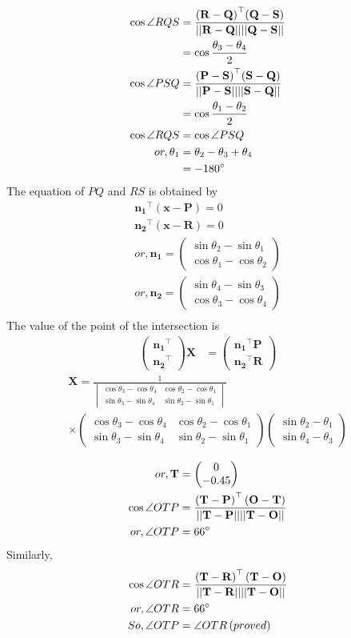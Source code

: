 \documentclass[12pt]{article}
\providecommand{\brak}[1]{\ensuremath{\left(#1\right)}}
\providecommand{\myvec}[1]{\ensuremath{\begin{pmatrix}#1\end{pmatrix}}}
\providecommand{\mydet}[1]{\ensuremath{\begin{vmatrix}#1\end{vmatrix}}}
\providecommand{\norm}[1]{\ensuremath{\lvert|#1\rvert|}}
\let\vec\mathbf
\begin{document}
\begin{align}
  \cos{\angle RQS}&=\frac{\vec{\brak{R-Q}}^{\top}\vec{\brak{Q-S}}}{\vec{\norm{R-Q}\norm{Q-S}}}\\
  &=\cos{\frac{\theta_3-\theta_4}{2}}\\
   \cos{\angle PSQ}&=\frac{\vec{\brak{P-S}}^{\top}\vec{\brak{S-Q}}}{\vec{\norm{P-S}\norm{S-Q}}}\\
  &=\cos{\frac{\theta_1-\theta_2}{2}}\\
   \cos{\angle RQS}&=\cos{\angle PSQ}\\
   or,\theta_1&=\theta_2-\theta_3+\theta_4\\
   &=-180\degree
  \end{align}
The equation of $PQ$ and $RS$ is obtained by
\begin{align}
  \vec{n_1}^{\top}\vec{\brak{x-P}}=0\\
  \vec{n_2}^{\top}\vec{\brak{x-R}}=0\\
  or,\vec{n_1}=\myvec{\sin{\theta_2}-\sin{\theta_1}\\\cos{\theta_1}-\cos{\theta_2}}\\
  or,\vec{n_2}=\myvec{\sin{\theta_4}-\sin{\theta_3}\\\cos{\theta_3}-\cos{\theta_4}}\\
 \end{align}
  The value of the point of the intersection is
\begin{align}
    \myvec{\vec{n_1}^{\top}\\\vec{n_2}^{\top}}\vec{X}&=\myvec{\vec{n_1}^{\top}\vec{P}\\\vec{n_2}^{\top}\vec{R}}
    \end{align}
\begin{multline}
    \vec{X}=\frac{1}{\mydet{\cos{\theta_3}-\cos{\theta_4}&\cos{\theta_2}-\cos{\theta_1}\\\sin{\theta_3}-\sin{\theta_4}&\sin{\theta_2}-\sin{\theta_1}}}\\\times
    \myvec{\cos{\theta_3}-\cos{\theta_4}&\cos{\theta_2}-\cos{\theta_1}\\\sin{\theta_3}-\sin{\theta_4}&\sin{\theta_2}-\sin{\theta_1}}\myvec{\sin{\theta_2-\theta_1}\\\sin{\theta_4-\theta_3}}\\
\end{multline}
    \begin{align}
        or,\vec{T} &= \myvec{0\\-0.45}\\
\cos{\angle OTP} &= \frac{\brak{\vec{T-P}}^{\top}\brak{\vec{O-T}}}{\vec{\norm{T-P}\norm{T-O}}}\\
or, \angle OTP&= 66\degree
\end{align}
Similarly,
\begin{align}
   \cos{\angle OTR} &= \frac{\brak{\vec{T-R}}^{\top}\brak{\vec{T-O}}}{\vec{\norm{T-R}\norm{T-O}}}\\
or, \angle OTR&= 66\degree \\
So,\angle OTP &= \angle OTR \brak{proved}
\end{align}
\end{document}
